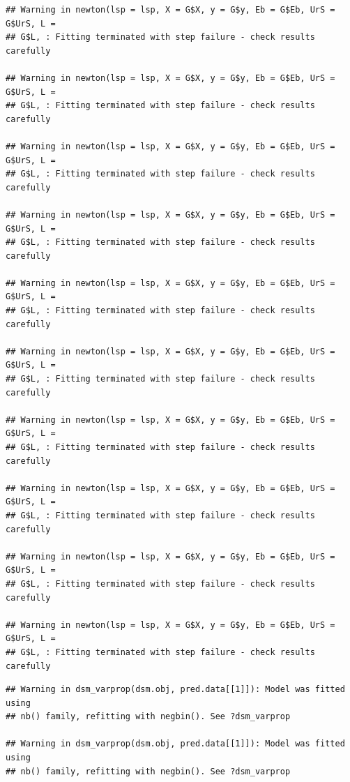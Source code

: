 \documentclass[]{book}
\theoremstyle{definition}
\theoremstyle{definition}
\theoremstyle{remark}
\begin{document}
\begin{verbatim}
## Warning in newton(lsp = lsp, X = G$X, y = G$y, Eb = G$Eb, UrS = G$UrS, L =
## G$L, : Fitting terminated with step failure - check results carefully

## Warning in newton(lsp = lsp, X = G$X, y = G$y, Eb = G$Eb, UrS = G$UrS, L =
## G$L, : Fitting terminated with step failure - check results carefully

## Warning in newton(lsp = lsp, X = G$X, y = G$y, Eb = G$Eb, UrS = G$UrS, L =
## G$L, : Fitting terminated with step failure - check results carefully

## Warning in newton(lsp = lsp, X = G$X, y = G$y, Eb = G$Eb, UrS = G$UrS, L =
## G$L, : Fitting terminated with step failure - check results carefully

## Warning in newton(lsp = lsp, X = G$X, y = G$y, Eb = G$Eb, UrS = G$UrS, L =
## G$L, : Fitting terminated with step failure - check results carefully

## Warning in newton(lsp = lsp, X = G$X, y = G$y, Eb = G$Eb, UrS = G$UrS, L =
## G$L, : Fitting terminated with step failure - check results carefully

## Warning in newton(lsp = lsp, X = G$X, y = G$y, Eb = G$Eb, UrS = G$UrS, L =
## G$L, : Fitting terminated with step failure - check results carefully

## Warning in newton(lsp = lsp, X = G$X, y = G$y, Eb = G$Eb, UrS = G$UrS, L =
## G$L, : Fitting terminated with step failure - check results carefully

## Warning in newton(lsp = lsp, X = G$X, y = G$y, Eb = G$Eb, UrS = G$UrS, L =
## G$L, : Fitting terminated with step failure - check results carefully

## Warning in newton(lsp = lsp, X = G$X, y = G$y, Eb = G$Eb, UrS = G$UrS, L =
## G$L, : Fitting terminated with step failure - check results carefully
\end{verbatim}

\begin{verbatim}
## Warning in dsm_varprop(dsm.obj, pred.data[[1]]): Model was fitted using
## nb() family, refitting with negbin(). See ?dsm_varprop

## Warning in dsm_varprop(dsm.obj, pred.data[[1]]): Model was fitted using
## nb() family, refitting with negbin(). See ?dsm_varprop
\end{verbatim}
\end{document}
